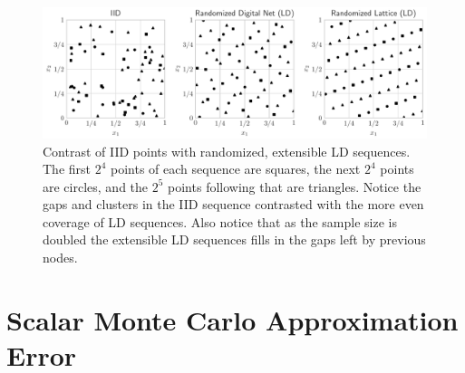 \documentclass[graybox]{svmult}
\begin{document}
\begin{figure}[t]
    \centering
    \includegraphics[width=\textwidth]{figs/ld_seqs.pdf}
    \caption{Contrast of IID points with randomized, extensible LD sequences. The first $2^4$ points of each sequence are squares, the next $2^4$ points are circles, and the $2^5$ points following that are triangles. Notice the gaps and clusters in the IID sequence contrasted with the more even coverage of LD sequences. Also notice that as the sample size is doubled the extensible LD sequences fills in the gaps left by previous nodes.}
    \label{fig:ld_seqs}
\end{figure}


\section{Scalar Monte Carlo Approximation Error}\label{sec:Existing_QMC_Methods}
\end{document}
